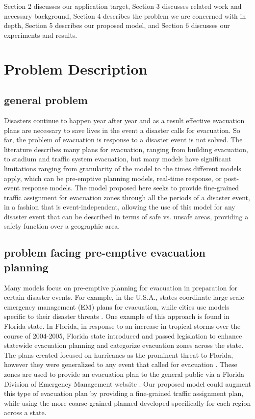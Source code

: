 \documentclass{sig-alternate-05-2015}
\begin{document}
	Section 2 discusses our application target, Section 3 discusses related work and necessary background, Section 4 describes the problem we are concerned with in depth, Section 5 describes our proposed model, and Section 6 discusses our experiments and results.
	
	\section{Problem Description}
		\subsection{general problem}
		Disasters continue to happen year after year and as a result effective evacuation plans are necessary to save lives in the event a disaster calls for evacuation. So far, the problem of evacuation is response to a disaster event is not solved. The literature describes many plans for evacuation, ranging from building evacuation, to stadium and traffic system evacuation, but many models have significant limitations ranging from granularity of the model to the times different models apply, which can be pre-emptive planning models, real-time response, or post-event response models. The model proposed here seeks to provide fine-grained traffic assignment for evacuation zones through all the periods of a disaster event, in a fashion that is event-independent, allowing the use of this model for any disaster event that can be described in terms of safe vs. unsafe areas, providing a safety function over a geographic area.

		\subsection{problem facing pre-emptive evacuation planning}
		Many models focus on pre-emptive planning for evacuation in preparation for certain disaster events. For example, in the U.S.A.,  states coordinate large scale emergency management (EM) plans for evacuation, while cities use models specific to their disaster threats \cite{urbina2003national}. One example of this approach is found in Florida state. In Florida, in response to an increase in tropical storms over the course of 2004-2005, Florida state introduced and passed legislation to enhance statewide evacuation planning and categorize evacuation zones across the state. The plans created focused on hurricanes as the prominent threat to Florida, however they were generalized to any event that called for evacuation \cite{florida2017evacplan}. These zones are used to provide an evacuation plan to the general public via a Florida Division of Emergency Management website \cite{florida2017em}. Our proposed model could augment this type of evacuation plan by providing a fine-grained traffic assignment plan, while using the more coarse-grained planned developed specifically for each region across a state.
\end{document}
